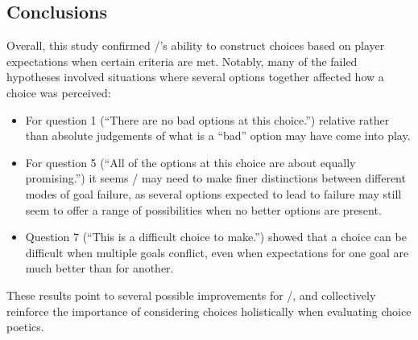 \subsection{Conclusions}

Overall, this study confirmed \dunyazad/'s ability to construct choices based on player expectations when certain criteria are met.
%
Notably, many of the failed hypotheses involved situations where several options together affected how a choice was perceived:
%
\begin{itemize}
  \item For question 1 (``There are no bad options at this choice.'') relative rather than absolute judgements of what is a ``bad'' option may have come into play.
  \item For question 5 (``All of the options at this choice are about equally promising.'') it seems \dunyazad/ may need to make finer distinctions between different modes of goal failure, as several options expected to lead to failure may still seem to offer a range of possibilities when no better options are present.
  \item Question 7 (``This is a difficult choice to make.'') showed that a choice can be difficult when multiple goals conflict, even when expectations for one goal are much better than for another.
\end{itemize}
%
These results point to several possible improvements for \dunyazad/, and collectively reinforce the importance of considering choices holistically when evaluating choice poetics.


